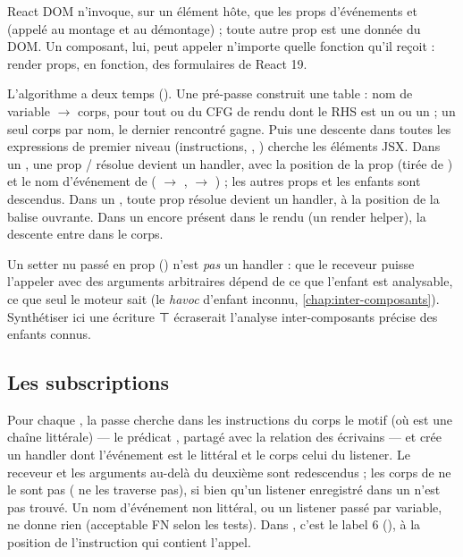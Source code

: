 \begin{react}
React DOM n'invoque, sur un élément hôte, que les props d'événements  et  (appelé au montage et au démontage) ; toute autre prop est une donnée du DOM. Un composant, lui, peut appeler n'importe quelle fonction qu'il reçoit : render props,  en fonction,  des formulaires de React 19.
\end{react}

L'algorithme a deux temps (). Une pré-passe construit une table  : nom de variable $\to$ corps, pour tout  ou  du CFG de rendu dont le RHS est un  ou un  ; un seul corps par nom, le dernier rencontré gagne. Puis une descente dans toutes les expressions de premier niveau (instructions, , ) cherche les éléments JSX. Dans un , une prop / résolue devient un handler, avec la position de la prop (tirée de ) et le nom d'événement de  ( $\to$ ,  $\to$ ) ; les autres props et les enfants sont descendus. Dans un , toute prop résolue devient un handler, à la position de la balise ouvrante. Dans un  encore présent dans le rendu (un render helper), la descente entre dans le corps.

Un setter nu passé en prop () n'est \emph{pas} un handler : que le receveur puisse l'appeler avec des arguments arbitraires dépend de ce que l'enfant est analysable, ce que seul le moteur sait (le \emph{havoc} d'enfant inconnu, \cref{chap:inter-composants}). Synthétiser ici une écriture ⊤ écraserait l'analyse inter-composants précise des enfants connus.

\subsection{Les subscriptions}


Pour chaque , la passe cherche dans les instructions du corps le motif  (où  est une chaîne littérale) --- le prédicat , partagé avec la relation des écrivains --- et crée un handler dont l'événement est le littéral et le corps celui du listener. Le receveur et les arguments au-delà du deuxième sont redescendus ; les corps de  ne le sont pas ( ne les traverse pas), si bien qu'un listener enregistré dans un  n'est pas trouvé. Un nom d'événement non littéral, ou un listener passé par variable, ne donne rien (\og acceptable FN\fg{} selon les tests). Dans , c'est le label 6 (), à la position de l'instruction qui contient l'appel.

